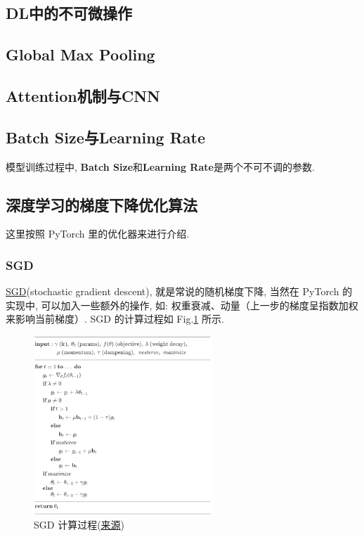 \subsection{DL中的不可微操作}

\subsection{Global Max Pooling}

\subsection{Attention机制与CNN}

\subsection{Batch Size与Learning Rate}
模型训练过程中, \textbf{Batch Size}和\textbf{Learning Rate}是两个不可不调的参数. 


\subsection{深度学习的梯度下降优化算法}
这里按照 PyTorch 里的优化器来进行介绍. 
\subsubsection{SGD}
\href{https://pytorch.org/docs/stable/generated/torch.optim.SGD.html#torch.optim.SGD}{SGD}(stochastic gradient descent), 就是常说的随机梯度下降, 当然在 PyTorch 的实现中, 可以加入一些额外的操作, 如: 权重衰减、动量（上一步的梯度呈指数加权来影响当前梯度）. SGD 的计算过程如 Fig.\ref{fig:sgd} 所示. 

\begin{figure}[h]
	\centering
	\includegraphics[width=0.6\textwidth]{pics/sgd.png}
	\caption{SGD 计算过程(\href{https://pytorch.org/docs/stable/generated/torch.optim.SGD.html#torch.optim.SGD}{来源})}
	\label{fig:sgd}
\end{figure}

